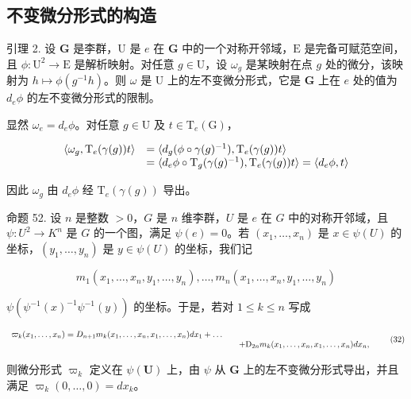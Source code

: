 \subsection{不变微分形式的构造}

引理 2. 设 \(\mathbf{G}\) 是李群，\(\mathrm{U}\) 是 \(e\) 在 \(\mathbf{G}\) 中的一个对称开邻域，\(\mathrm{E}\) 是完备可赋范空间，且 \(\phi: \mathrm{U}^2 \to \mathrm{E}\) 是解析映射。对任意 \(g \in \mathrm{U}\)，设 \(\omega_g\) 是某映射在点 \(g\) 处的微分，该映射为 \(h \mapsto \phi(g^{-1}h)\)。则 \(\omega\) 是 \(\mathrm{U}\) 上的左不变微分形式，它是 \(\mathbf{G}\) 上在 \(e\) 处的值为 \(d_e\phi\) 的左不变微分形式的限制。

显然 \(\omega_{e} = d_{e}\phi\)。对任意 \(g \in \mathrm{U}\) 及 \(t \in \mathrm{T}_{e}(\mathrm{G})\)，

\[
\begin{array}{r l} \langle \omega_ {g}, \mathrm{T} _ {e} (\gamma (g)) t \rangle & = \langle d _ {g} (\phi \circ \gamma (g) ^ {- 1}), \mathrm{T} _ {e} (\gamma (g)) t \rangle \\ & = \langle d _ {e} \phi \circ \mathrm{T} _ {g} (\gamma (g) ^ {- 1}), \mathrm{T} _ {e} (\gamma (g)) t \rangle = \langle d _ {e} \phi , t \rangle \end{array}
\]

因此 \(\omega_{g}\) 由 \(d_{e}\phi\) 经 \(\mathrm{T}_{e}(\gamma(g))\) 导出。

命题 52. 设 \(n\) 是整数 \(>0\)，\(G\) 是 \(n\) 维李群，\(U\) 是 \(e\) 在 \(G\) 中的对称开邻域，且 \(\psi: U^2 \to K^n\) 是 \(G\) 的一个图，满足 \(\psi(e) = 0\)。若 \((x_1, \ldots, x_n)\) 是 \(x \in \psi(U)\) 的坐标，\((y_1, \ldots, y_n)\) 是 \(y \in \psi(U)\) 的坐标，我们记

\[
m _ {1} (x _ {1}, \dots , x _ {n}, y _ {1}, \dots , y _ {n}), \dots , m _ {n} (x _ {1}, \dots , x _ {n}, y _ {1}, \dots , y _ {n})
\]

\(\psi (\psi^{-1}(x)^{-1}\psi^{-1}(y))\) 的坐标。于是，若对 \(1\leqslant k\leqslant n\) 写成

\[
\begin{array}{r l} \varpi_ {k} (x _ {1}, \ldots , x _ {n}) = D _ {n + 1} m _ {k} (x _ {1}, \ldots , x _ {n}, x _ {1}, \ldots , x _ {n}) d x _ {1} + \dots \\ & \quad + \mathrm{D} _ {2 n} m _ {k} (x _ {1}, \ldots , x _ {n}, x _ {1}, \ldots , x _ {n}) d x _ {n}, \end{array}\tag{32}
\]

则微分形式 \(\varpi_k\) 定义在 \(\psi(\mathbf{U})\) 上，由 \(\psi\) 从 \(\mathbf{G}\) 上的左不变微分形式导出，并且满足 \(\varpi_k(0,\ldots,0) = dx_k\)。

